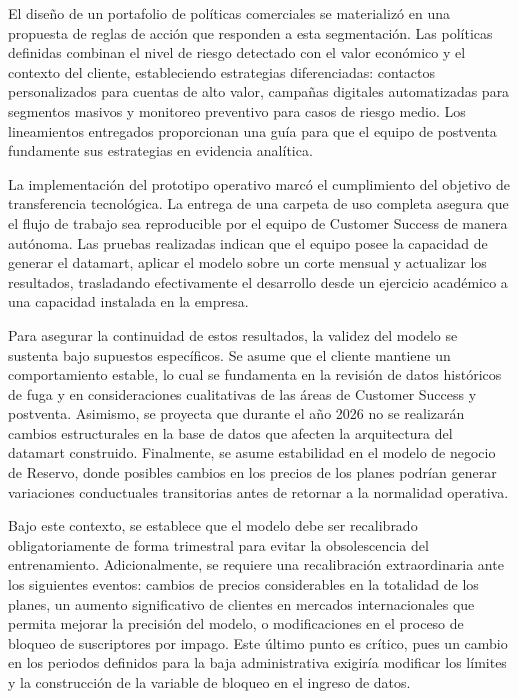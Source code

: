 El diseño de un portafolio de políticas comerciales se materializó en una propuesta de reglas de acción que responden a esta segmentación. Las políticas definidas combinan el nivel de riesgo detectado con el valor económico y el contexto del cliente, estableciendo estrategias diferenciadas: contactos personalizados para cuentas de alto valor, campañas digitales automatizadas para segmentos masivos y monitoreo preventivo para casos de riesgo medio. Los lineamientos entregados proporcionan una guía para que el equipo de postventa fundamente sus estrategias en evidencia analítica.

La implementación del prototipo operativo marcó el cumplimiento del objetivo de transferencia tecnológica. La entrega de una carpeta de uso completa asegura que el flujo de trabajo sea reproducible por el equipo de Customer Success de manera autónoma. Las pruebas realizadas indican que el equipo posee la capacidad de generar el datamart, aplicar el modelo sobre un corte mensual y actualizar los resultados, trasladando efectivamente el desarrollo desde un ejercicio académico a una capacidad instalada en la empresa.

Para asegurar la continuidad de estos resultados, la validez del modelo se sustenta bajo supuestos específicos. Se asume que el cliente mantiene un comportamiento estable, lo cual se fundamenta en la revisión de datos históricos de fuga y en consideraciones cualitativas de las áreas de Customer Success y postventa. Asimismo, se proyecta que durante el año 2026 no se realizarán cambios estructurales en la base de datos que afecten la arquitectura del datamart construido. Finalmente, se asume estabilidad en el modelo de negocio de Reservo, donde posibles cambios en los precios de los planes podrían generar variaciones conductuales transitorias antes de retornar a la normalidad operativa.

Bajo este contexto, se establece que el modelo debe ser recalibrado obligatoriamente de forma trimestral para evitar la obsolescencia del entrenamiento. Adicionalmente, se requiere una recalibración extraordinaria ante los siguientes eventos: cambios de precios considerables en la totalidad de los planes, un aumento significativo de clientes en mercados internacionales que permita mejorar la precisión del modelo, o modificaciones en el proceso de bloqueo de suscriptores por impago. Este último punto es crítico, pues un cambio en los periodos definidos para la baja administrativa exigiría modificar los límites y la construcción de la variable de bloqueo en el ingreso de datos.

